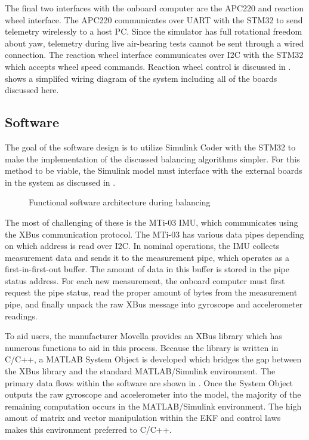 The final two interfaces with the onboard computer are the APC220 and reaction wheel interface. The APC220 communicates over UART with the STM32 to send telemetry wirelessly to a host PC. Since the simulator has full rotational freedom about yaw, telemetry during live air-bearing tests cannot be sent through a wired connection. The reaction wheel interface communicates over I2C with the STM32 which accepts wheel speed commands. Reaction wheel control is discussed in \cite{nalley2025development}.  shows a simplifed wiring diagram of the system including all of the boards discussed here.


\subsection{Software}\label{sec:software}

The goal of the software design is to utilize Simulink Coder with the STM32 to make the implementation of the discussed balancing algorithms simpler. For this method to be viable, the Simulink model must interface with the external boards in the system as discussed in . 

\begin{figure}[h]
    \centering
    
    \caption{Functional software architecture during balancing}
    \label{fig:software_flowchart}
\end{figure}

The most of challenging of these is the MTi-03 IMU, which communicates using the XBus communication protocol. The MTi-03 has various data pipes depending on which address is read over I2C. In nominal operations, the IMU collects measurement data and sends it to the measurement pipe, which operates as a first-in-first-out buffer. The amount of data in this buffer is stored in the pipe status address. For each new measurement, the onboard computer must first request the pipe status, read the proper amount of bytes from the measurement pipe, and finally unpack the raw XBus message into gyroscope and accelerometer readings. 

To aid users, the manufacturer Movella provides an XBus library which has numerous functions to aid in this process. Because the library is written in C/C++, a MATLAB System Object is developed which bridges the gap between the XBus library and the standard MATLAB/Simulink environment. The primary data flows within the software are shown in . Once the System Object outputs the raw gyroscope and accelerometer into the model, the majority of the remaining computation occurs in the MATLAB/Simulink environment. The high amout of matrix and vector manipulation within the EKF and control laws makes this environment preferred to C/C++. 

